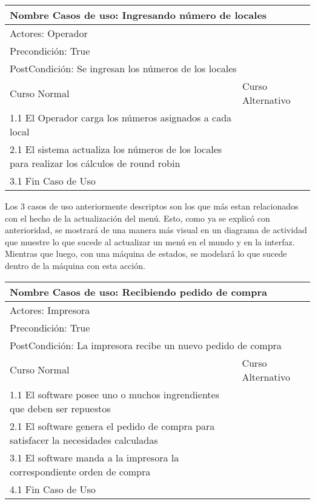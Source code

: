 \documentclass[a4paper,10pt]{article}
\begin{document}
\bigskip

\begin{center}
\begin{tabularx}{14cm}{|X|X|}
\hline
\multicolumn{2}{|l|}{Nombre Casos de uso: Ingresando n\'umero de locales}\\
\hline
\multicolumn{2}{|l|}{Actores: Operador}\\
\hline
\multicolumn{2}{|l|}{Precondici\'on: True}\\
\hline
\multicolumn{2}{|l|}{PostCondici\'on: Se ingresan los n\'umeros de los locales}\\
\hline
Curso Normal & Curso Alternativo\\
\hline
1.1 El Operador carga los n\'umeros asignados a cada local & 
\\
\hline
2.1 El sistema actualiza los n\'umeros de los locales para realizar los c\'alculos de round robin & 
\\
\hline
3.1 Fin Caso de Uso &
\\
\hline
\end{tabularx}
\end{center}

\bigskip

Los 3 casos de uso anteriormente descriptos son los que m\'as estan relacionados con el hecho de la actualizaci\'on del men\'u. Esto, como ya se
explic\'o con anterioridad, se mostrar\'a de una manera m\'as visual en un diagrama de actividad que muestre lo que sucede al actualizar un men\'u
en el mundo y en la interfaz. Mientras que luego, con una m\'aquina de estados, se modelar\'a lo que sucede dentro de la m\'aquina con esta acci\'on.

\bigskip

\begin{center}
\begin{tabularx}{14cm}{|X|X|}
\hline
\multicolumn{2}{|l|}{Nombre Casos de uso: Recibiendo pedido de compra}\\
\hline
\multicolumn{2}{|l|}{Actores: Impresora}\\
\hline
\multicolumn{2}{|l|}{Precondici\'on: True}\\
\hline
\multicolumn{2}{|l|}{PostCondici\'on: La impresora recibe un nuevo pedido de compra}\\
\hline
Curso Normal & Curso Alternativo\\
\hline
1.1 El software posee uno o muchos ingrendientes que deben ser repuestos & 
\\
\hline
2.1 El software genera el pedido de compra para satisfacer la necesidades calculadas & 
\\
\hline
3.1 El software manda a la impresora la correspondiente orden de compra &
\\
\hline
4.1 Fin Caso de Uso &
\\
\hline
\end{tabularx}
\end{center}
\end{document}
